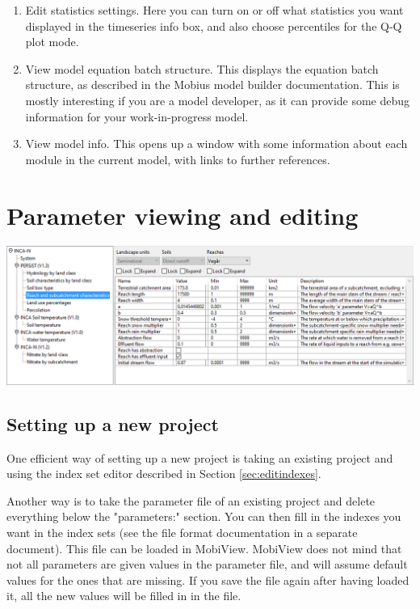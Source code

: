 \documentclass[11pt]{article}
\theoremstyle{definition}
\begin{document}
\begin{enumerate}
\item Edit statistics settings. Here you can turn on or off what statistics you want displayed in the timeseries info box, and also choose percentiles for the Q-Q plot mode.
\item View model equation batch structure. This displays the equation batch structure, as described in the Mobius model builder documentation. This is mostly interesting if you are a model developer, as it can provide some debug information for your work-in-progress model.
\item View model info. This opens up a window with some information about each module in the current model, with links to further references.
\end{enumerate}

\section{Parameter viewing and editing}

\begin{center}
\includegraphics[width=\linewidth]{img/paramedit}
\end{center}

\subsection{Setting up a new project}

One efficient way of setting up a new project is taking an existing project and using the index set editor described in Section \ref{sec:editindexes}.

Another way is to take the parameter file of an existing project and delete everything below the "parameters:" section. You can then fill in the indexes you want in the index sets (see the file format documentation in a separate document). This file can be loaded in MobiView. MobiView does not mind that not all parameters are given values in the parameter file, and will assume default values for the ones that are missing. If you save the file again after having loaded it, all the new values will be filled in in the file.
\end{document}
